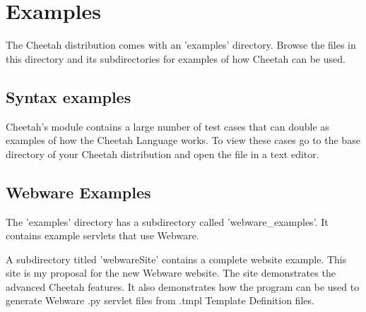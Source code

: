 \section{Examples}
\label{examples}

The Cheetah distribution comes with an 'examples' directory.  Browse the
files in this directory and its subdirectories for examples of how
Cheetah can be used.

\subsection{Syntax examples}
Cheetah's  module contains a large number of test cases that can
double as examples of how the Cheetah Language works.  To view these cases go to
the base directory of your Cheetah distribution and open the file
 in a text editor.


\subsection{Webware Examples}
The 'examples' directory has a subdirectory called 'webware_examples'.  It
contains example servlets that use Webware.  

A subdirectory titled 'webwareSite' contains a complete website example. This
site is my proposal for the new Webware website.  The site demonstrates the
advanced Cheetah features.  It also demonstrates how the 
program can be used to generate Webware .py servlet files from .tmpl Template
Definition files.

